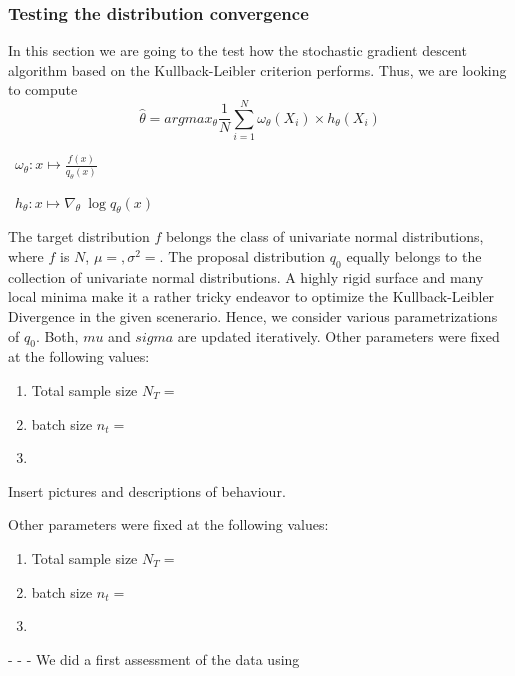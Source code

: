 \subsubsection{Testing the distribution convergence}

In this section we are going to the test how the stochastic gradient descent algorithm based on the Kullback-Leibler criterion performs. Thus, we are looking to compute 
$$\hat{\theta} = argmax_{\theta} \frac 1 N \displaystyle\sum_{i = 1}^N \omega_\theta(X_i) \times h_\theta(X_i)$$

\faAngleRight \ $\omega_\theta : x \mapsto \frac{f(x)}{q_\theta(x)}$

\faAngleRight \ $h_\theta : x \mapsto \nabla_\theta \ \log q_\theta(x)$

The target distribution $f$ belongs the class of univariate normal distributions, where $f$ is $N$, $\mu = , \sigma^2 = $. The proposal distribution $q_0$ equally belongs to the collection of univariate normal distributions. A highly rigid surface and many local minima make it a rather tricky endeavor to optimize the Kullback-Leibler Divergence in the given scenerario. Hence, we consider various parametrizations of $q_0$.
Both, $mu$ and $sigma$ are updated iteratively. 
Other parameters were fixed at the following values:
\begin{enumerate}
    \item Total sample size $N_T = $
    \item batch size $n_t = $
    \item 
\end{enumerate} 

Insert pictures and descriptions of behaviour. 

Other parameters were fixed at the following values:
\begin{enumerate}
    \item Total sample size $N_T = $
    \item batch size $n_t = $
    \item 
\end{enumerate} 
-
-
-
We did a first assessment of the data using 